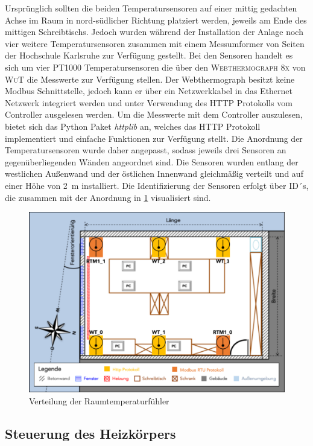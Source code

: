 Ursprünglich sollten die beiden Temperatursensoren auf einer mittig gedachten Achse im Raum in nord-südlicher Richtung platziert werden, jeweils am Ende des mittigen Schreibtischs. Jedoch wurden während der Installation der Anlage noch vier weitere Temperatursensoren zusammen mit einem Messumformer von Seiten der Hochschule Karlsruhe zur Verfügung gestellt. 
Bei den Sensoren handelt es sich um vier PT1000 Temperatursensoren die über den \textsc{Webthermograph 8x} von \textsc{WuT} die Messwerte zur Verfügung stellen. Der Webthermograph besitzt keine Modbus Schnittstelle, jedoch kann er über ein Netzwerkkabel in das Ethernet Netzwerk integriert werden und unter Verwendung des HTTP Protokolls vom Controller ausgelesen werden.
Um die Messwerte mit dem Controller auszulesen, bietet sich das Python Paket \textit{httplib} an, welches das HTTP Protokoll implementiert und einfache Funktionen zur Verfügung stellt. 
Die Anordnung der Temperatursensoren wurde daher angepasst, sodass jeweils drei Sensoren an gegenüberliegenden Wänden angeordnet sind. Die Sensoren wurden entlang der westlichen Außenwand und der östlichen Innenwand gleichmäßig verteilt und auf einer Höhe von 2~m installiert. Die Identifizierung der Sensoren erfolgt über ID´s, die zusammen mit der Anordnung in \ref{fig:raumtempsensors} visualisiert sind.

\begin{figure}
\centering
\includegraphics[width=\textwidth]{abbildungen/20160324_sensors}
\caption{Verteilung der Raumtemperaturfühler}
\label{fig:raumtempsensors}
\end{figure}

\subsection{Steuerung des Heizkörpers}

